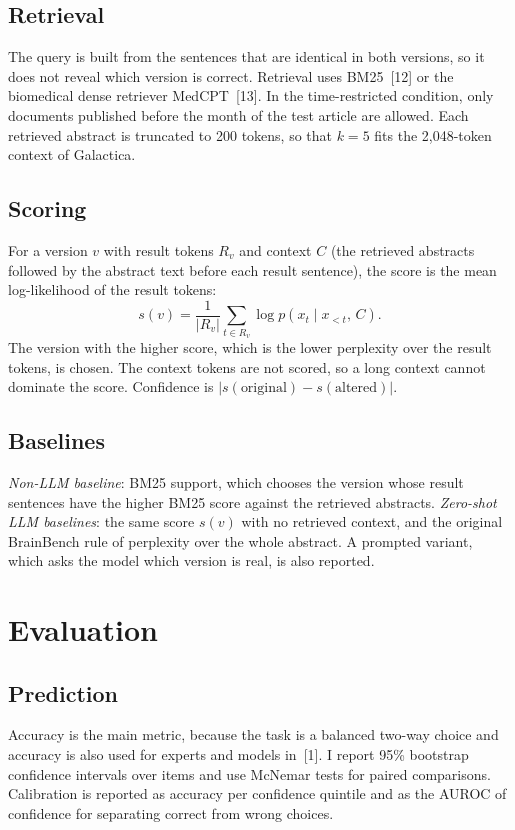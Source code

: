 \documentclass[10pt,a4paper]{article}
\begin{document}
\subsection{Retrieval}
The query is built from the sentences that are identical in both versions, so it does not reveal which version is correct. Retrieval uses BM25~[12] or the biomedical dense retriever MedCPT~[13]. In the time-restricted condition, only documents published before the month of the test article are allowed. Each retrieved abstract is truncated to 200 tokens, so that $k=5$ fits the 2,048-token context of Galactica.

\subsection{Scoring}
For a version $v$ with result tokens $R_v$ and context $C$ (the retrieved abstracts followed by the abstract text before each result sentence), the score is the mean log-likelihood of the result tokens:
\[
s(v) = \frac{1}{|R_v|}\sum_{t \in R_v} \log p\left(x_t \mid x_{<t},\, C\right).
\]
The version with the higher score, which is the lower perplexity over the result tokens, is chosen. The context tokens are not scored, so a long context cannot dominate the score. Confidence is $|s(\text{original}) - s(\text{altered})|$.

\subsection{Baselines}
\emph{Non-LLM baseline}: BM25 support, which chooses the version whose result sentences have the higher BM25 score against the retrieved abstracts. \emph{Zero-shot LLM baselines}: the same score $s(v)$ with no retrieved context, and the original BrainBench rule of perplexity over the whole abstract. A prompted variant, which asks the model which version is real, is also reported.

\section{Evaluation}\label{sec:eval}
\subsection{Prediction}
Accuracy is the main metric, because the task is a balanced two-way choice and accuracy is also used for experts and models in~[1]. I report 95\% bootstrap confidence intervals over items and use McNemar tests for paired comparisons. Calibration is reported as accuracy per confidence quintile and as the AUROC of confidence for separating correct from wrong choices.
\end{document}
